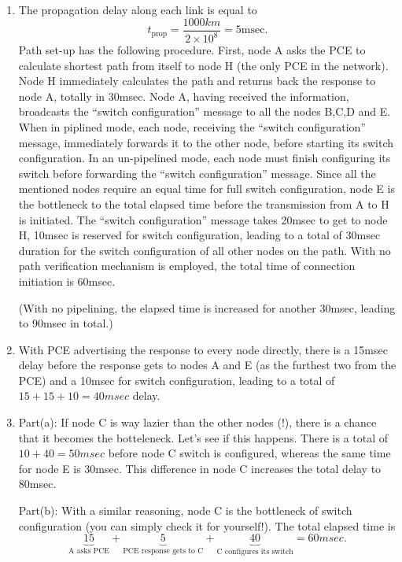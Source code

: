 \documentclass[a4paper]{article}
\begin{document}
\begin{enumerate}[label=\alph*-]
\item
The propagation delay along each link is equal to
$$t_\text{prop}=\frac{1000km}{2\times 10^8}=5\text{msec}.$$
Path set-up has the following procedure. First, node A asks the PCE to calculate shortest path from itself to node H (the only PCE in the network). Node H immediately calculates the path and returns back the response to node A, totally in 30msec. Node A, having received the information, broadcasts the ``switch configuration'' message to all the nodes B,C,D and E. When in piplined mode, each node, receiving the ``switch configuration'' message, immediately forwards it to the other node, before starting its switch configuration. In an un-pipelined mode, each node must finish configuring its switch before forwarding the ``switch configuration'' message. Since all the mentioned nodes require an equal time for full switch configuration, node E is the bottleneck to the total elapsed time before the transmission from A to H is initiated. The ``switch configuration'' message takes 20msec to get to node H, 10msec is reserved for switch configuration, leading to a total of 30msec duration for the switch configuration of all other nodes on the path. With no path verification mechanism is employed, the total time of connection initiation is 60msec.

(With no pipelining, the elapsed time is increased for another 30msec, leading to 90msec in total.)
\item
With PCE advertising the response to every node directly, there is a 15msec delay before the response gets to nodes A and E (as the furthest two from the PCE) and a 10msec for switch configuration, leading to a total of $15+15+10=40msec$ delay.

\item
Part(a): If node C is way lazier than the other nodes (!), there is a chance that it becomes the botteleneck. Let's see if this happens. There is a total of $10+40=50msec$ before node C switch is configured, whereas the same time for node E is 30msec. This difference in node C increases the total delay to 80msec.

Part(b): With a similar reasoning, node C is the bottleneck of switch configuration (you can simply check it for yourself!). The total elapsed time is 
$$
\underbrace{15}_{\text{A asks PCE}}
+
\underbrace{5}_{\text{PCE response gets to C}}
+
\underbrace{40}_{\text{C configures its switch}}=60msec.
$$
\end{enumerate}
\end{document}
